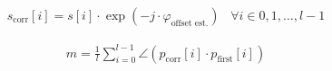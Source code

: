 \begin{align}
  \label{eq:sys_pes_correct}
  s_{\text{corr}}[i] = s[i] \cdot \exp(-j \cdot \varphi_{\text{offset est.}})
  \;\;\; \forall i \in {0, 1, \dots, l-1}
\end{align}

\begin{align}
  \label{eq:sys_pes_angle}
  m = \frac{1}{l}
  \sum_{i=0}^{l-1} \angle(p_{\text{corr}}[i] \cdot p_{\text{first}}[i])
\end{align}

